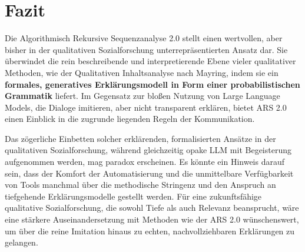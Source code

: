 \documentclass{article}
\begin{document}
\section{Fazit}
Die Algorithmisch Rekursive Sequenzanalyse 2.0 stellt einen wertvollen, aber bisher in der qualitativen Sozialforschung unterrepräsentierten Ansatz dar. Sie überwindet die rein beschreibende und interpretierende Ebene vieler qualitativer Methoden, wie der Qualitativen Inhaltsanalyse nach Mayring, indem sie ein \textbf{formales, generatives Erklärungsmodell in Form einer probabilistischen Grammatik} liefert. Im Gegensatz zur bloßen Nutzung von Large Language Models, die Dialoge imitieren, aber nicht transparent erklären, bietet ARS 2.0 einen Einblick in die zugrunde liegenden Regeln der Kommunikation.

Das zögerliche Einbetten solcher erklärenden, formalisierten Ansätze in der qualitativen Sozialforschung, während gleichzeitig opake LLM mit Begeisterung aufgenommen werden, mag paradox erscheinen. Es könnte ein Hinweis darauf sein, dass der Komfort der Automatisierung und die unmittelbare Verfügbarkeit von Tools manchmal über die methodische Stringenz und den Anspruch an tiefgehende Erklärungsmodelle gestellt werden. Für eine zukunftsfähige qualitative Sozialforschung, die sowohl Tiefe als auch Relevanz beansprucht, wäre eine stärkere Auseinandersetzung mit Methoden wie der ARS 2.0 wünschenswert, um über die reine Imitation hinaus zu echten, nachvollziehbaren Erklärungen zu gelangen.
\end{document}
